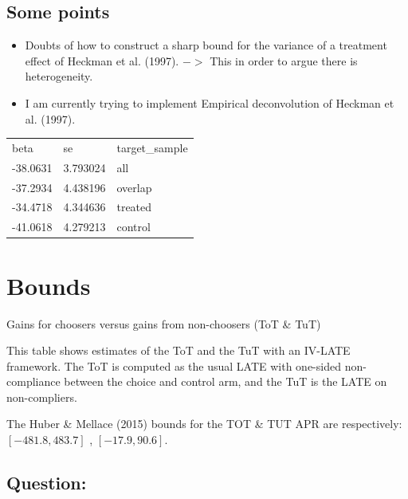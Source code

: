 \documentclass[oneside,11pt]{article}
\begin{document}
\subsection{Some points}

\begin{itemize}
    \item Doubts of how to construct a sharp bound for the variance of a treatment effect of Heckman et al. (1997). $->$ This in order to argue there is heterogeneity.
    
    \item I am currently trying to implement Empirical deconvolution of Heckman et al. (1997).
\end{itemize}




\begin{tabular}{rrl}
\multicolumn{1}{l}{beta} & \multicolumn{1}{l}{se} & target\_sample \\
-38.0631 & 3.793024 & all \\
-37.2934 & 4.438196 & overlap \\
-34.4718 & 4.344636 & treated \\
-41.0618 & 4.279213 & control \\
\end{tabular}%

\newpage

\section{Bounds}


\begin{table}[H]
\caption{Gains for choosers versus gains from non-choosers (ToT \& TuT)}
\label{tot_tut}
\begin{center}
\scriptsize{}
\end{center}
 \scriptsize This table shows estimates of the ToT and the TuT with an IV-LATE framework. The ToT is computed as the usual LATE with one-sided non-compliance between the choice and control arm, and the TuT is the LATE on non-compliers. 
\end{table}

The Huber \& Mellace (2015) bounds for the TOT \& TUT APR are respectively:
$[-481.8, 483.7]$ , $[-17.9, 90.6]$. \\

\subsection{Question:}
\end{document}
